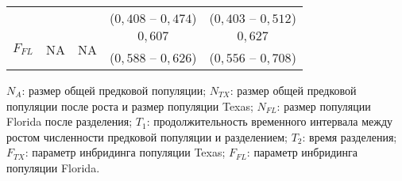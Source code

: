 \begin{table}[ht]
{\begin{tabular}{|l|c|c|c|c|}
        & & & ($0{,}408$ -- $0{,}474$) & ($0{,}403$ -- $0{,}512$) \\
        \multirow{2}{*}{$F_{FL}$} & \multirow{2}{*}{NA} & \multirow{2}{*}{NA} & $0{,}607$ &  $0{,}627$ \\
        & & & ($0{,}588$ -- $0{,}626$) & ($0{,}556$ -- $0{,}708$) \\
        \hline
    \end{tabular}%
    }
    \begin{tablenotes}
      \footnotesize
      \item $N_A$: размер общей предковой популяции; $N_{TX}$: размер общей предковой популяции после роста и размер популяции Texas; $N_{FL}$: размер популяции Florida после разделения; $T_1$: продолжительность временного интервала между ростом численности предковой популяции и разделением; $T_2$: время разделения;  $F_{TX}$: параметр инбридинга популяции Texas;  $F_{FL}$: параметр инбридинга популяции Florida.
    \end{tablenotes}
    \label{tab:app1:puma:results}
\end{table}


